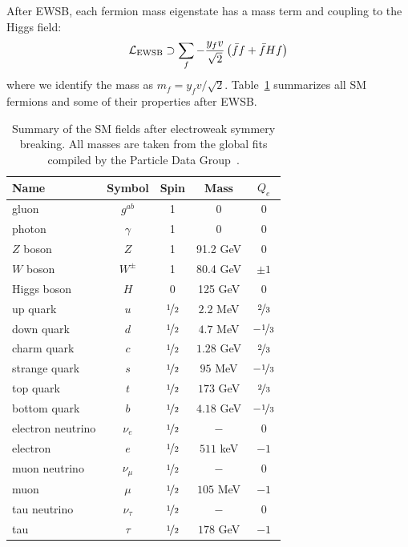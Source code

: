 After EWSB, each fermion mass eigenstate has a mass term and coupling to the Higgs field:
\begin{equation}
    \mathcal{L}_\mathrm{EWSB} \supset \sum_f -\frac{y_f v}{\sqrt{2}} \left( \bar ff + \bar fH f\right)
\end{equation}
where we identify the mass as $m_f = y_f v/\sqrt{2}$. 
Table~\ref{tab:theory:ewsb} summarizes all SM fermions and some of their properties after EWSB.

\begin{table}[]
\begin{center}
    \caption{Summary of the SM fields after electroweak symmery breaking.
             All masses are taken from the global fits compiled by the Particle Data Group~\cite{pdg}.}
    \label{tab:theory:ewsb}
    \begin{tabular}{l|c|c|c|c}
        Name & Symbol & Spin & Mass & $Q_e$  \\  \hline \hline
        gluon & $g^{ab}$ & 1 & 0 & 0 \\   
        photon & $\gamma $ & 1 & 0 & 0 \\   
        $Z$ boson & $Z$ & 1 & 91.2 GeV & 0 \\   
        $W$ boson & $W^{\pm}$ & 1 & 80.4 GeV & $\pm 1$ \\   \hline 
        Higgs boson & $H$ & 0 & 125 GeV & $0$ \\   \hline 
        up quark & $u$ & $\nicefrac{1}{2}$ & $2.2$ MeV & $\nicefrac{2}{3}$    \\   
        down quark & $d$  & $\nicefrac{1}{2}$ & $4.7$ MeV  & $-\nicefrac{1}{3}$  \\   
        charm quark & $c$  & $\nicefrac{1}{2}$ & $1.28$ GeV  & $\nicefrac{2}{3}$  \\   
        strange quark & $s$  & $\nicefrac{1}{2}$ & $95$ MeV  & $-\nicefrac{1}{3}$  \\   
        top quark & $t$  & $\nicefrac{1}{2}$ & $173$ GeV  & $\nicefrac{2}{3}$  \\  \hline
        bottom quark & $b$  & $\nicefrac{1}{2}$ & $4.18$ GeV  & $-\nicefrac{1}{3}$  \\   
        electron neutrino  & $\nu_e$  & $\nicefrac{1}{2}$ & $-$  & $0$  \\   
        electron  & $e$  & $\nicefrac{1}{2}$ & $511$ keV  & $-1$  \\   
        muon neutrino  & $\nu_\mu$  & $\nicefrac{1}{2}$ & $-$  & $0$  \\   
        muon  & $\mu$  & $\nicefrac{1}{2}$ & $105$ MeV  & $-1$  \\   
        tau neutrino  & $\nu_\tau$  & $\nicefrac{1}{2}$ & $-$  & $0$  \\ 
        tau  & $\tau$  & $\nicefrac{1}{2}$ & $178$ GeV  & $-1$  \\   
    \end{tabular}
\end{center}
\end{table}


